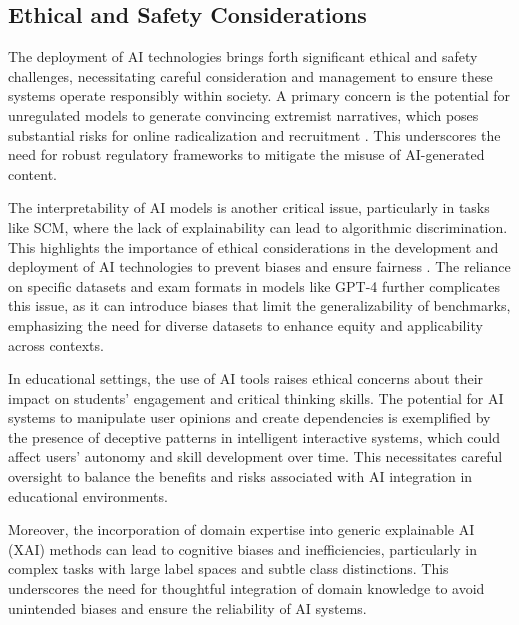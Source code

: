 \subsection{Ethical and Safety Considerations} \label{subsec:Ethical and Safety Considerations}

The deployment of AI technologies brings forth significant ethical and safety challenges, necessitating careful consideration and management to ensure these systems operate responsibly within society. A primary concern is the potential for unregulated models to generate convincing extremist narratives, which poses substantial risks for online radicalization and recruitment \cite{mcguffie2020radicalizationrisksgpt3advanced}. This underscores the need for robust regulatory frameworks to mitigate the misuse of AI-generated content.



The interpretability of AI models is another critical issue, particularly in tasks like SCM, where the lack of explainability can lead to algorithmic discrimination. This highlights the importance of ethical considerations in the development and deployment of AI technologies to prevent biases and ensure fairness \cite{lin2023interpretabilityframeworksimilarcase}. The reliance on specific datasets and exam formats in models like GPT-4 further complicates this issue, as it can introduce biases that limit the generalizability of benchmarks, emphasizing the need for diverse datasets to enhance equity and applicability across contexts.



In educational settings, the use of AI tools raises ethical concerns about their impact on students' engagement and critical thinking skills. The potential for AI systems to manipulate user opinions and create dependencies is exemplified by the presence of deceptive patterns in intelligent interactive systems, which could affect users' autonomy and skill development over time. This necessitates careful oversight to balance the benefits and risks associated with AI integration in educational environments.



Moreover, the incorporation of domain expertise into generic explainable AI (XAI) methods can lead to cognitive biases and inefficiencies, particularly in complex tasks with large label spaces and subtle class distinctions. This underscores the need for thoughtful integration of domain knowledge to avoid unintended biases and ensure the reliability of AI systems.



